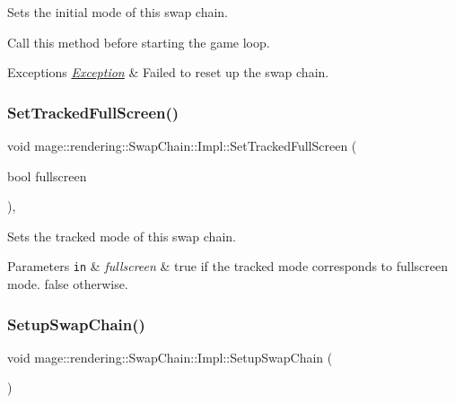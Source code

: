 Sets the initial mode of this swap chain.

Call this method before starting the game loop.


\begin{DoxyExceptions}{Exceptions}
{\em \mbox{\hyperlink{classmage_1_1_exception}{Exception}}} & Failed to reset up the swap chain. \\
\hline
\end{DoxyExceptions}
\mbox{\label{classmage_1_1rendering_1_1_swap_chain_1_1_impl_a6f97179cc5e352a349ed943413d149e7}} 
\subsubsection{\texorpdfstring{Set\+Tracked\+Full\+Screen()}{SetTrackedFullScreen()}}
{\footnotesize\ttfamily void mage\+::rendering\+::\+Swap\+Chain\+::\+Impl\+::\+Set\+Tracked\+Full\+Screen (\begin{DoxyParamCaption}\item[{bool}]{fullscreen }\end{DoxyParamCaption})\hspace{0.3cm}{\ttfamily [private]}, {\ttfamily [noexcept]}}

Sets the tracked mode of this swap chain.


\begin{DoxyParams}[1]{Parameters}
\mbox{\tt in}  & {\em fullscreen} & {\ttfamily true} if the tracked mode corresponds to fullscreen mode. {\ttfamily false} otherwise. \\
\hline
\end{DoxyParams}
\mbox{\label{classmage_1_1rendering_1_1_swap_chain_1_1_impl_a1e34fe9c72a24a0345a9ba317762863d}} 
\subsubsection{\texorpdfstring{Setup\+Swap\+Chain()}{SetupSwapChain()}}
{\footnotesize\ttfamily void mage\+::rendering\+::\+Swap\+Chain\+::\+Impl\+::\+Setup\+Swap\+Chain (\begin{DoxyParamCaption}{ }\end{DoxyParamCaption})\hspace{0.3cm}{\ttfamily [private]}}

